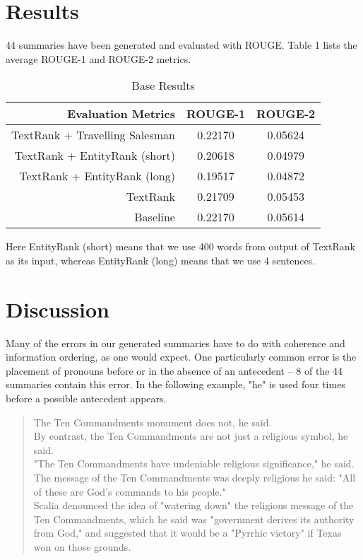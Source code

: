 \documentclass[11pt]{article}
\begin{document}
	\section{Results}
	
	44 summaries have been generated and evaluated with ROUGE. Table 1 lists the average ROUGE-1 and ROUGE-2 metrics.
	
	\begin{table}[ht]
		\caption{Base Results} 
		\centering
		\begin{tabular}{r c c}
			\hline
			Evaluation Metrics & ROUGE-1 & ROUGE-2 \\
			\hline
			TextRank + Travelling Salesman      & 0.22170 & 0.05624 \\
			\hline
			TextRank + EntityRank (short)      & 0.20618 & 0.04979 \\			
			\hline
			TextRank + EntityRank (long)     & 0.19517 & 0.04872 \\
			\hline
			TextRank          & 0.21709 & 0.05453 \\
			\hline
			Baseline          & 0.22170 & 0.05614 \\
			\hline
		\end{tabular}
	\end{table}
	
	Here EntityRank (short) means that we use 400 words from output of TextRank as its input, whereas EntityRank (long) means that we use 4 sentences.
	
	\section{Discussion}
	
	Many of the errors in our generated summaries have to do with coherence and information ordering, as one would expect. One particularly common error is the placement of pronouns before or in the absence of an antecedent -- 8 of the 44 summaries contain this error. In the following example, "he" is used four times before a possible antecedent appears.\\
	
	\begin{quote}
		The Ten Commandments monument does not, he said.\\
		By contrast, the Ten Commandments are not just a religious symbol, he said.\\
		"The Ten Commandments have undeniable religious significance," he said.\\
		The message of the Ten Commandments was deeply religious he said: "All of these are God's commands to his people."\\
		Scalia denounced the idea of "watering down" the religious message of the Ten Commandments, which he said was "government derives its authority from God," and suggested that it would be a "Pyrrhic victory" if Texas won on those grounds.
	\end{quote}
	
\end{document}
